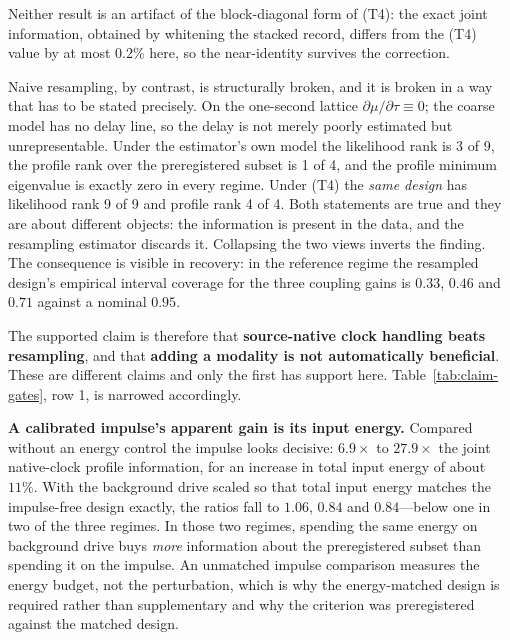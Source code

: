 Neither result is an artifact of the block-diagonal form of (T4): the exact
joint information, obtained by whitening the stacked record, differs from the
(T4) value by at most \(0.2\%\) here, so the near-identity survives the
correction.

Naive resampling, by contrast, is structurally broken, and it is broken in a
way that has to be stated precisely. On the one-second lattice
\(\partial\mu/\partial\tau\equiv0\); the coarse model has no delay line, so the
delay is not merely poorly estimated but unrepresentable. Under the estimator's
own model the likelihood rank is 3 of 9, the profile rank over the preregistered
subset is 1 of 4, and the profile minimum eigenvalue is exactly zero in every
regime. Under (T4) the \emph{same design} has likelihood rank 9 of 9 and profile
rank 4 of 4. Both statements are true and they are about different objects: the
information is present in the data, and the resampling estimator discards it.
Collapsing the two views inverts the finding. The consequence is visible in
recovery: in the reference regime the resampled design's empirical interval
coverage for the three coupling gains is \(0.33\), \(0.46\) and \(0.71\) against
a nominal \(0.95\).

The supported claim is therefore that \textbf{source-native clock handling beats
resampling}, and that \textbf{adding a modality is not automatically
beneficial}. These are different claims and only the first has support here.
Table~\ref{tab:claim-gates}, row 1, is narrowed accordingly.

\textbf{A calibrated impulse's apparent gain is its input energy.} Compared
without an energy control the impulse looks decisive: \(6.9\times\) to
\(27.9\times\) the joint native-clock profile information, for an increase in
total input energy of about \(11\%\). With the background drive scaled so that
total input energy matches the impulse-free design exactly, the ratios fall to
\(1.06\), \(0.84\) and \(0.84\)---below one in two of the three regimes. In
those two regimes, spending the same energy on background drive buys \emph{more}
information about the preregistered subset than spending it on the impulse. An
unmatched impulse comparison measures the energy budget, not the perturbation,
which is why the energy-matched design is required rather than supplementary and
why the criterion was preregistered against the matched design.


